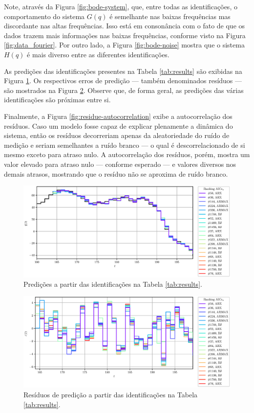 \documentclass{ppgeesa}
\begin{document}
Note, através da Figura \ref{fig:bode-system}, que, entre todas as identificações, o comportamento do sistema $G(q)$ é semelhante nas baixas frequências mas discordante nas altas frequências.
Isso está em consonância com o fato de que os dados trazem mais informações nas baixas frequências, conforme visto na Figura \ref{fig:data_fourier}.
Por outro lado, a Figura \ref{fig:bode-noise} mostra que o sistema $H(q)$ é mais diverso entre as diferentes identificações.

As predições das identificações presentes na Tabela \ref{tab:results} são exibidas na Figura \ref{fig:prediction}.
Os respectivos erros de predição --- também denominados resíduos --- são mostrados na Figura \ref{fig:residue}.
Observe que, de forma geral, as predições das várias identificações são próximas entre si.

Finalmente, a Figura \ref{fig:residue-autocorrelation} exibe a autocorrelação dos resíduos.
Caso um modelo fosse capaz de explicar plenamente a dinâmica do sistema, então os resíduos decorreriam apenas da aleatoriedade do ruído de medição e seriam semelhantes a ruído branco --- o qual é descorrelacionado de si mesmo exceto para atraso nulo.
A autocorrelação dos resíduos, porém, mostra um valor elevado para atraso nulo --- conforme esperado --- e valores diversos nos demais atrasos, mostrando que o resíduo não se aproxima de ruído branco.
\begin{figure}[!htbp]
  \centering
  \includegraphics[width=\linewidth]{prediction_AICCv}
  \caption{Predições a partir das identificações na Tabela \ref{tab:results}.}
  \label{fig:prediction}
\end{figure}

\begin{figure}[!htbp]
  \centering
  \includegraphics[width=\linewidth]{residue_AICCv}
  \caption{Resíduos de predição a partir das identificações na Tabela \ref{tab:results}.}
  \label{fig:residue}
\end{figure}
\end{document}
